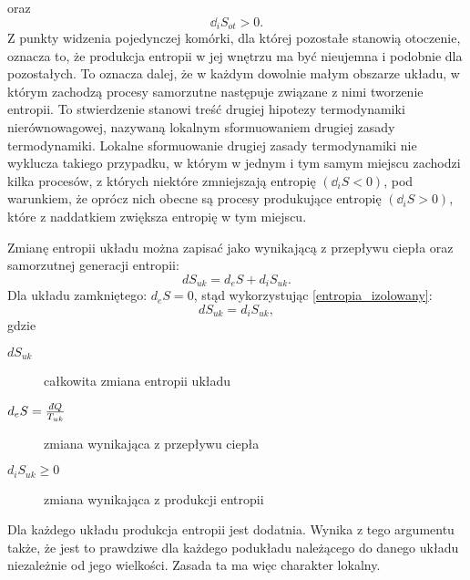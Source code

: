 \documentclass[10pt, a4paper, twoside, onecolumn]{article}
\numberwithin{equation}{section}
\newcommand{\dbar}{d\hspace*{-0.08em}\bar{}\hspace*{0.1em}}
\begin{document}
	oraz
	\begin{equation*}
		\dd_{i}S_{ot}>0.
	\end{equation*}
	Z punkty widzenia pojedynczej komórki, dla której pozostałe stanowią otoczenie, oznacza to, że produkcja entropii w jej wnętrzu ma być nieujemna i podobnie dla pozostałych. To oznacza dalej, że w każdym dowolnie małym obszarze układu, w którym zachodzą procesy samorzutne następuje związane z nimi tworzenie entropii. To stwierdzenie stanowi treść drugiej hipotezy termodynamiki nierównowagowej, nazywaną lokalnym sformuowaniem drugiej zasady termodynamiki. Lokalne sformuowanie drugiej zasady termodynamiki nie wyklucza takiego przypadku, w którym w jednym i tym samym miejscu zachodzi kilka procesów, z których niektóre zmniejszają entropię \((\dd_{i}S<0)\), pod warunkiem, że oprócz nich obecne są procesy produkujące entropię \((\dd_{i}S>0)\), które z naddatkiem zwiększa entropię w tym miejscu. 
	




	Zmianę entropii układu można zapisać jako wynikającą z przepływu ciepła oraz samorzutnej generacji entropii: 
	\begin{equation}
		dS_{uk}=d_{e}S+d_{i}S_{uk}.
	\end{equation}
	Dla układu zamkniętego: \(d_{e}S=0\), stąd wykorzystując \eqref{entropia_izolowany}:
	\begin{equation}
		dS_{uk}=d_{i}S_{uk},
	\end{equation}
	gdzie
	\begin{description}
		\item[\(dS_{uk}\)] całkowita zmiana entropii układu
		\item[\(d_{e}S=\frac{\dbar Q}{T_{uk}}\)] zmiana wynikająca z przepływu ciepła
		\item[\(d_{i}S_{uk}\geq 0\)] zmiana wynikająca z produkcji entropii
	\end{description}
	Dla każdego układu produkcja entropii jest dodatnia. Wynika z tego argumentu także, że jest to prawdziwe dla każdego podukładu należącego do danego układu niezależnie od jego wielkości. Zasada ta ma więc charakter lokalny. 
	
	
	
\end{document}
